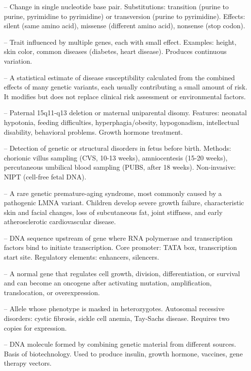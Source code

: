 -- Change in single nucleotide base pair. Substitutions: transition (purine to purine, pyrimidine to pyrimidine) or transversion (purine to pyrimidine). Effects: silent (same amino acid), missense (different amino acid), nonsense (stop codon).

-- Trait influenced by multiple genes, each with small effect. Examples: height, skin color, common diseases (diabetes, heart disease). Produces continuous variation.

-- A statistical estimate of disease susceptibility calculated from the combined effects of many genetic variants, each usually contributing a small amount of risk. It modifies but does not replace clinical risk assessment or environmental factors.

-- Paternal 15q11-q13 deletion or maternal uniparental disomy. Features: neonatal hypotonia, feeding difficulties, hyperphagia/obesity, hypogonadism, intellectual disability, behavioral problems. Growth hormone treatment.

-- Detection of genetic or structural disorders in fetus before birth. Methods: chorionic villus sampling (CVS, 10-13 weeks), amniocentesis (15-20 weeks), percutaneous umbilical blood sampling (PUBS, after 18 weeks). Non-invasive: NIPT (cell-free fetal DNA).

-- A rare genetic premature-aging syndrome, most commonly caused by a pathogenic LMNA variant. Children develop severe growth failure, characteristic skin and facial changes, loss of subcutaneous fat, joint stiffness, and early atherosclerotic cardiovascular disease.

-- DNA sequence upstream of gene where RNA polymerase and transcription factors bind to initiate transcription. Core promoter: TATA box, transcription start site. Regulatory elements: enhancers, silencers.

-- A normal gene that regulates cell growth, division, differentiation, or survival and can become an oncogene after activating mutation, amplification, translocation, or overexpression.

-- Allele whose phenotype is masked in heterozygotes. Autosomal recessive disorders: cystic fibrosis, sickle cell anemia, Tay-Sachs disease. Requires two copies for expression.

-- DNA molecule formed by combining genetic material from different sources. Basis of biotechnology. Used to produce insulin, growth hormone, vaccines, gene therapy vectors.


